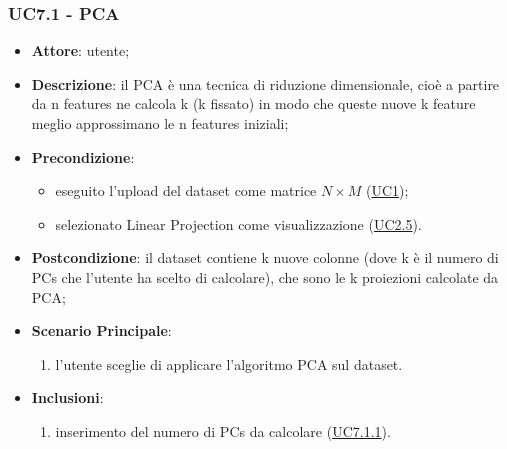     \subsubsection{UC7.1 - PCA}
    \label{uc7.1}
    \begin{itemize}
    \item \textbf{Attore}: utente;
    \item \textbf{Descrizione}: il PCA è una tecnica di riduzione dimensionale, cioè a partire da n features ne calcola k (k fissato) in modo che queste nuove k feature meglio approssimano le n features iniziali;
    \item \textbf{Precondizione}: 
    \begin{itemize}
        \item eseguito l'upload del dataset come matrice $N\times M$ (\hyperref[uc1]{UC1});
        \item selezionato Linear Projection come visualizzazione (\hyperref[uc2.5]{UC2.5}).
    \end{itemize}  
    \item \textbf{Postcondizione}: il dataset contiene k nuove colonne (dove k è il numero di PCs che l'utente ha scelto di calcolare), che sono le k proiezioni calcolate da PCA;
    \item \textbf{Scenario Principale}: 
    \begin{enumerate}
        \item l'utente sceglie di applicare l'algoritmo PCA sul dataset.
    \end{enumerate}  
    \item \textbf{Inclusioni}:
        \begin{enumerate}
            \item inserimento del numero di PCs da calcolare (\hyperref[uc7.1.1]{UC7.1.1}).
        \end{enumerate} 
    \end{itemize}
    
